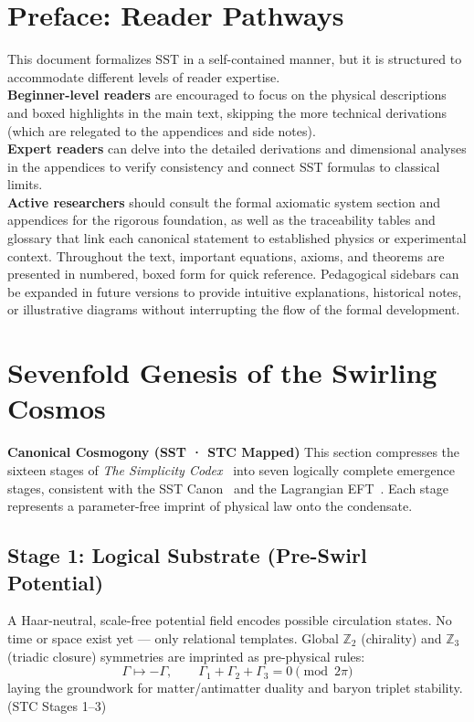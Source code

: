 \documentclass[reprint,aps,onecolumn,nofootinbib]{revtex4-2}
\begin{document}
    	\section*{Preface: Reader Pathways}
	This document formalizes SST in a self-contained manner, but it is structured to accommodate different levels of reader expertise.\\
        \textbf{Beginner-level readers} are encouraged to focus on the physical descriptions and boxed highlights in the main text, skipping the more technical derivations (which are relegated to the appendices and side notes).\\
        \textbf{Expert readers} can delve into the detailed derivations and dimensional analyses in the appendices to verify consistency and connect SST formulas to classical limits.\\
        \textbf{Active researchers} should consult the formal axiomatic system section and appendices for the rigorous foundation, as well as the traceability tables and glossary that link each canonical statement to established physics or experimental context. Throughout the text, important equations, axioms, and theorems are presented in numbered, boxed form for quick reference. Pedagogical sidebars can be expanded in future versions to provide intuitive explanations, historical notes, or illustrative diagrams without interrupting the flow of the formal development.

\section{Sevenfold Genesis of the Swirling Cosmos}
\label{sec:cosmogony-seven}

\noindent
\textbf{Canonical Cosmogony (SST · STC Mapped)}
This section compresses the sixteen stages of \emph{The Simplicity Codex}~\cite{Goldau2025_STC}
into seven logically complete emergence stages, consistent with the SST Canon~\canonversion{}
and the Lagrangian EFT~\cite{Iskandarani2025_Lagrangian}.
Each stage represents a parameter-free imprint of physical law onto the condensate.

\subsection*{Stage 1: Logical Substrate (Pre-Swirl Potential)}
A Haar-neutral, scale-free potential field encodes possible circulation states.
No time or space exist yet — only relational templates.
Global $\mathbb{Z}_2$ (chirality) and $\mathbb{Z}_3$ (triadic closure) symmetries are imprinted as pre-physical rules:
\[
\Gamma \mapsto -\Gamma,
\qquad
\Gamma_1 + \Gamma_2 + \Gamma_3 = 0 \pmod{2\pi}
\]
laying the groundwork for matter/antimatter duality and baryon triplet stability.
\hfill (STC Stages 1–3)
\end{document}
